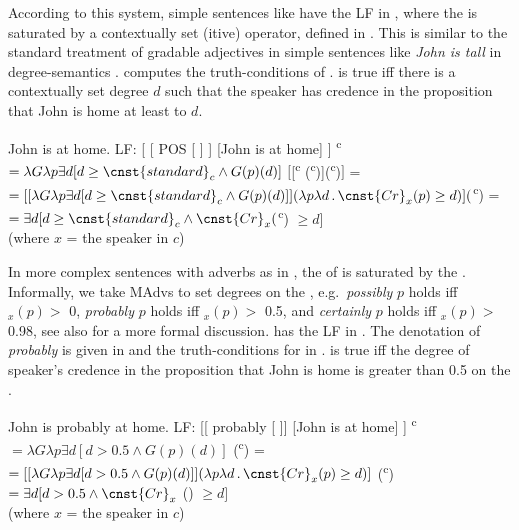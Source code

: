 \documentclass[output=paper,colorlinks,citecolor=brown,newtxmath]{langsci/langscibook}
\begin{document}
\noindent According to this system, simple sentences like  have the LF in , where the  is saturated by a contextually set (itive) operator, defined in . This is similar to the standard treatment of gradable adjectives in simple sentences like \textit{John is tall} in degree-semantics \citep[e.g.][]{mcnken05}.  computes the truth-conditions of .  is true iff there is a contextually set degree $d$ such that the speaker has credence in the proposition that John is home at least to $d$.

    \ea \ea John is at home. \label{simplea}
    	 \ex LF: [ [ POS [  ] ] [John is at home] ] \label{simpleb}
         \ex {}\textsuperscript{c} \(= \lambda G\lambda p\exists d[d \geq \cnst{standard}_{c} \wedge G(p)(d)]\) \label{sxpos}
         \ex $\big[$[\textsuperscript{c} (\textsuperscript{c})](\textsuperscript{c})$\big]$ = \\
      	$ = [[\lambda G\lambda p\exists d[d \geq \cnst{standard}_{c}  \wedge G(p)(d)]](\lambda p\lambda d\,.\, \cnst{Cr}_{x}(p) \geq d)]($\textsuperscript{c}) = \\
         $= \exists d[d \geq \cnst{standard}_{c} \wedge \cnst{Cr}_{x}($\textsuperscript{c}) $\geq d ]$  \\
         (where $x$ = the speaker in $c$)	\label{simpled}
    \z \z

\noindent In more complex sentences with  adverbs as in , the  of  is saturated by the . Informally, we take MAdvs to set degrees on the , e.g.\ \textit{possibly} $p$ holds iff $_{x}(p) >$ 0, \textit{probably} $p$ holds iff $_{x}(p) >$ 0.5, and \textit{certainly} $p$ holds iff $_{x}(p) >$ 0.98, see also \citet{grewol17} for a more formal discussion.  has the LF in . The denotation of \textit{probably} is given in  and the truth-conditions for  in .  is true iff the degree of speaker's credence in the proposition that John is home is greater than 0.5 on the .


 	\ea \ea John is probably at home. \label{clxa}
    	\ex LF: [[ probably [  ]] [John is at home] ] \label{clxb}
        \ex {}\textsuperscript{c} $= \lambda G\lambda p\exists d[d > 0.5 \wedge G(p)(d)]$ \label{clxc}
         (\textsuperscript{c}) = \\
		 $= [[\lambda G\lambda p\exists d[d > 0.5  \wedge G(p)(d)]](\lambda p\lambda d\,.\, \cnst{Cr}_{x}(p) \geq d)]$ (\textsuperscript{c}) \\
		 $= \exists d[d > 0.5 \wedge \cnst{Cr}_{x}$ () $\geq d]$ \\
       (where $x$ = the speaker in $c$) \label{clxd}
 \z \z
\end{document}
